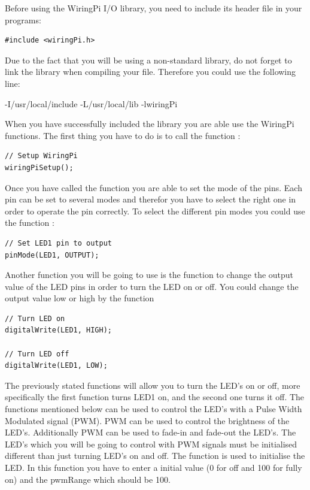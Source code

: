 Before using the WiringPi I/O library, you need to include its header file in your programs:

\begin{lstlisting}
#include <wiringPi.h>
\end{lstlisting}
Due to the fact that you will be using a non-standard library, do not forget to link the library when compiling your file. Therefore you could use the following line:

	\begin{codeblock}
		-I/usr/local/include -L/usr/local/lib -lwiringPi
	\end{codeblock}
When you have successfully included the library you are able use the WiringPi functions. The first thing you have to do is to call the function :

\begin{lstlisting}
// Setup WiringPi
wiringPiSetup();
\end{lstlisting}
Once you have called the function  you are able to set the mode of the pins. Each pin can be set to several modes and therefor you have to select the right one in order to operate the pin correctly. To select the different pin modes you could use the function :

\begin{lstlisting}
// Set LED1 pin to output
pinMode(LED1, OUTPUT);
\end{lstlisting}

Another function you will be going to use is the function to change the output value of the LED pins in order to turn the LED on or off. You could change the output value low or high by the function 

\begin{lstlisting}
// Turn LED on
digitalWrite(LED1, HIGH);

// Turn LED off
digitalWrite(LED1, LOW);
\end{lstlisting}

The previously stated functions will allow you to turn the LED's on or off, more specifically the first function turns LED1 on, and the second one turns it off. The functions mentioned below can be used to control the LED's with a Pulse Width Modulated signal (PWM). PWM can be used to control the brightness of the LED's. Additionally PWM can be used to fade-in and fade-out the LED's. The LED's which you will be going to control with PWM signals must be initialised different than just turning LED's on and off. The function  is used to initialise the LED. In this function you have to enter a initial value (0 for off and 100 for fully  on) and the pwmRange which should be 100. 

